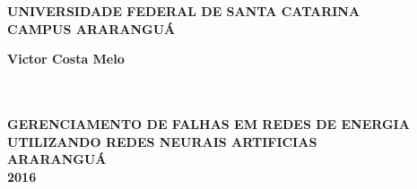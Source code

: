 \thispagestyle{empty}

\vfill
 \begin{center}
    

    {\large\bfseries UNIVERSIDADE FEDERAL DE SANTA CATARINA} \\
    
   
    {\large\bfseries CAMPUS ARARANGUÁ}  \\ 

    \vspace*{1in}
    \begin{large} \bfseries Victor Costa Melo \end{large}\\[0.4in]

    \vspace*{4cm}
    \noindent \\
    
    \large\bfseries{GERENCIAMENTO DE FALHAS EM REDES DE ENERGIA UTILIZANDO 		REDES NEURAIS ARTIFICIAS} \\
    \vfill
    \large\bfseries{ ARARANGUÁ \\ 2016}
\end{center}

\normalsize
